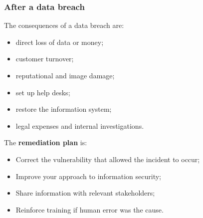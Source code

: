 \subsubsection{After a data breach}
The consequences of a data breach are:
\begin{itemize}
    \item direct loss of data or money;
    \item customer turnover;
    \item reputational and image damage;
    \item set up help desks;
    \item restore the information system;
    \item legal expenses and internal investigations.
\end{itemize}
The \textbf{remediation plan} is:
\begin{itemize}
    \item Correct the vulnerability that allowed the incident to occur;
    \item Improve your approach to information security;
    \item Share information with relevant stakeholders;
    \item Reinforce training if human error was the cause.
\end{itemize}
